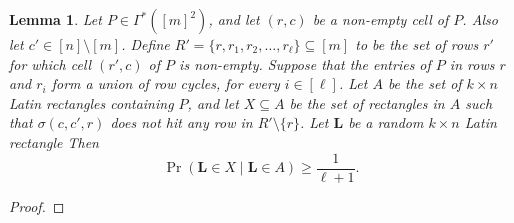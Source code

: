 \documentclass[12pt]{article}
\newtheorem{lem}[thm]{Lemma}
\theoremstyle{definition}
\numberwithin{equation}{section}
\renewcommand{\geq}{\geqslant}
\renewcommand{\L}{\mathbf{L}}
\begin{document}
	
	\begin{lem}\label{l:prelim2}
		Let $P \in \Gamma^*([m]^2)$, and let $(r, c)$ be a non-empty cell of
		$P$.  Also let $c' \in [n]\setminus [m]$. Define
		$R'=\{r,r_1,r_2,\ldots,r_\ell\}\subseteq[m]$ to be the set of rows
		$r'$ for which cell $(r',c)$ of $P$ is non-empty.
		Suppose that
		the entries of $P$ in rows $r$ and $r_i$ form a union of row
		cycles, for every $i \in [\ell]$.  
		Let $A$ be the set of $k \times n$ Latin rectangles containing $P$, and
		let $X\subseteq A$ be the set of rectangles in $A$ such that
		$\sigma(c, c', r)$ does not hit any row in $R'\setminus\{r\}$.
		Let $\L$ be a random $k \times n$ Latin rectangle Then
		\[
		\Pr(\L \in X\mid  \L \in A) \geq \frac1{\ell+1}.
		\]
	\end{lem}
	
	\begin{proof}

\end{proof}
\end{document}
